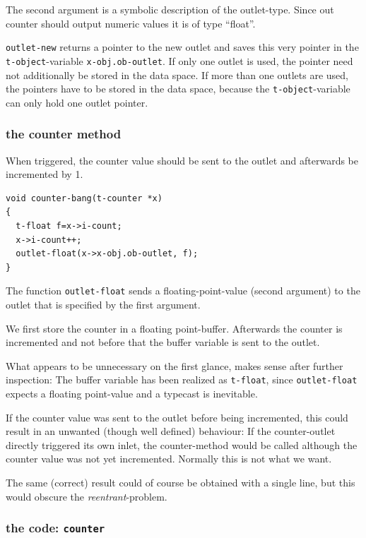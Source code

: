 \documentclass[draft]{ppgmus}
\begin{document}
The second argument is a symbolic description of the outlet-type.
Since out counter should output numeric values it is of type ``float''.

\verb+outlet-new+ returns a pointer to the new outlet and saves this very pointer
in the \verb+t-object+-variable \verb+x-obj.ob-outlet+.
If only one outlet is used, the pointer need not additionally be stored in the data space.
If more than one outlets are used, the pointers have to be stored in the data space,
because the \verb+t-object+-variable can only hold one outlet pointer.

\subsubsection{the counter method}
When triggered, the counter value should be sent to the outlet
and afterwards be incremented by 1.

\begin{verbatim}
void counter-bang(t-counter *x)
{
  t-float f=x->i-count;
  x->i-count++;
  outlet-float(x->x-obj.ob-outlet, f);
}
\end{verbatim}

The function \verb+outlet-float+ sends a floating-point-value (second argument) to the outlet
that is specified by the first argument.

We first store the counter in a floating point-buffer.
Afterwards the counter is incremented and not before that the buffer variable is sent 
to the outlet.

What appears to be unnecessary on the first glance, makes sense after further
inspection:
The buffer variable has been realized as \verb+t-float+,
since \verb+outlet-float+ expects a floating point-value and a typecast is
inevitable.

If the counter value was sent to the outlet before being incremented,
this could result in an unwanted (though well defined) behaviour:
If the counter-outlet directly triggered its own inlet,
the counter-method would be called although the counter value was not yet incremented.
Normally this is not what we want.

The same (correct) result could of course be obtained with a single line,
but this  would obscure the {\em reentrant}-problem.

\subsubsection{the code: \tt counter}
\end{document}
